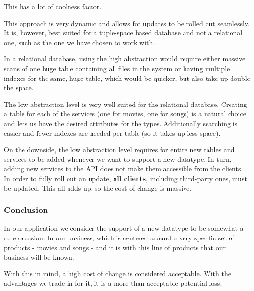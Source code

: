 This has a lot of coolness factor.

This approach is very dynamic and allows for updates to be rolled out seamlessly. It is, however,
best suited for a tuple-space based database and not a relational one, such as the one we have
chosen to work with.

In a relational database, using the high abstraction would require either massive scans of one
huge table containing all files in the system or having multiple indexes for the same, huge table,
which would be quicker, but also take up double the space.

The low abstraction level is very well suited for the relational database. Creating a table for each
of the services (one for movies, one for songs) is a natural choice and lets us have the desired
attributes for the types. Additionally searching is easier and fewer indexes are needed per table
(so it takes up less space).

On the downside, the low abstraction level requires for entire new tables and services to be added
whenever we want to support a new datatype. In turn, adding new services to the API does not make
them accessible from the clients. In order to fully roll out an update, {\bf all clients},
including third-party ones, must be updated. This all adds up, so the cost of change is massive.

\subsubsection{Conclusion}
In our application we consider the support of a new datatype to be somewhat a rare occasion. In our
business, which is centered around a very specific set of products - movies and songs - and it is with
this line of products that our business will be known.

With this in mind, a high cost of change is considered acceptable. With the advantages we trade in for
it, it is a more than acceptable potential loss.